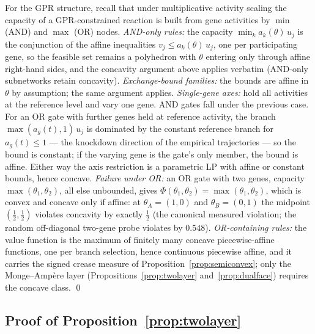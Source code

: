\documentclass[11pt,a4paper]{article}
\theoremstyle{plain}
\theoremstyle{definition}
\theoremstyle{remark}
\begin{document}
For the GPR structure, recall that under multiplicative activity
scaling the capacity of a GPR-constrained reaction is built from
gene activities by $\min$ (AND) and $\max$ (OR) nodes.
\emph{AND-only rules:} the capacity $\min_{k} a_{k}(\theta)\,u_{j}$
is the conjunction of the affine inequalities
$v_{j} \le a_{k}(\theta)\,u_{j}$, one per participating gene, so the
feasible set remains a polyhedron with $\theta$ entering only
through affine right-hand sides, and the concavity argument above
applies verbatim (AND-only subnetworks retain concavity).
\emph{Exchange-bound families:} the bounds are affine in $\theta$ by
assumption; the same argument applies. \emph{Single-gene axes:}
hold all activities at the reference level and vary one gene. AND
gates fall under the previous case. For an OR gate with further
genes held at reference activity, the branch
$\max(a_{g}(t),1)\,u_{j}$ is dominated by the constant reference
branch for $a_{g}(t) \le 1$ --- the knockdown direction of the
empirical trajectories --- so the bound is constant; if the varying
gene is the gate's only member, the bound is affine. Either way the
axis restriction is a parametric LP with affine or constant bounds,
hence concave. \emph{Failure under OR:} an OR gate with two genes,
capacity $\max(\theta_{1}, \theta_{2})$, all else unbounded, gives
$\Phi(\theta_{1},\theta_{2}) = \max(\theta_{1},\theta_{2})$, which
is convex and concave only if affine: at $\theta_{A} = (1,0)$ and
$\theta_{B} = (0,1)$ the midpoint $(\tfrac12,\tfrac12)$ violates
concavity by exactly $\tfrac12$ (the canonical measured violation;
the random off-diagonal two-gene probe violates by $0.548$).
\emph{OR-containing rules:} the value function is the maximum of
finitely many concave piecewise-affine functions, one per branch
selection, hence continuous piecewise affine, and it carries the
signed crease measure of Proposition~\ref{prop:semiconvex}; only the
Monge--Amp\`ere layer (Propositions~\ref{prop:twolayer}
and~\ref{prop:dualface}) requires the concave class. \qed

\subsection{Proof of Proposition~\ref{prop:twolayer}}
\end{document}
